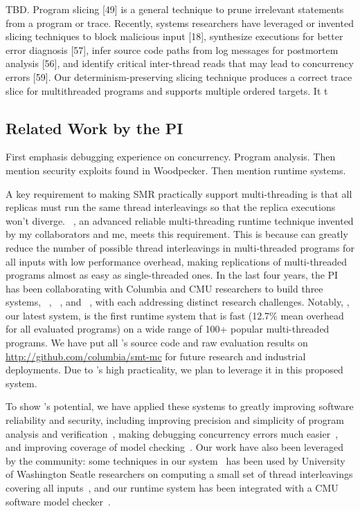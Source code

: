  TBD. Program slicing [49] is a general 
technique to prune irrelevant statements from a program or trace. Recently,
systems researchers have leveraged or invented slicing techniques
to block malicious input [18], synthesize executions for better error
diagnosis [57], infer source code paths from log messages for postmortem
analysis [56], and identify critical inter-thread reads that
may lead to concurrency errors [59]. Our determinism-preserving
slicing technique produces a correct trace slice for multithreaded
programs and supports multiple ordered targets. It t


\subsection{Related Work by the PI} \label{sec:my-work}

First emphasis debugging experience on concurrency. Program analysis.
Then mention security exploits found in Woodpecker.
Then mention runtime systems.

A key requirement to making SMR practically support multi-threading is that all 
replicas must run the same thread interleavings so that the replica executions 
won't diverge. \smt~\cite{smt:cacm}, an advanced reliable multi-threading 
runtime technique invented by my collaborators and me, meets this requirement. 
This is because \smt can greatly reduce the number of possible thread 
interleavings in multi-threaded programs for all inputs with low performance 
overhead, making replications of multi-threaded programs almost as easy as 
single-threaded ones. In the last four years, the PI has been collaborating 
with Columbia and CMU researchers to build three \smt systems, 
\tern~\cite{cui:tern:osdi10}, \peregrine~\cite{peregrine:sosp11}, and 
\parrot~\cite{parrot:sosp13}, with each addressing distinct research 
challenges. Notably, \parrot, our latest system, is the first \smt runtime 
system that is fast (12.7\% mean overhead for all evaluated programs) on a wide 
range of 100+ popular multi-threaded programs. We have 
put all \parrot's source code and raw evaluation results on 
\url{http://github.com/columbia/smt-mc} for future research and industrial 
deployments. Due to \parrot's high practicality, we plan to leverage it in this 
proposed \xxx system.

To show \smt's potential, we have applied these systems to greatly improving 
software reliability and security, including improving precision and simplicity 
of program analysis and verification~\cite{wu:pldi12}, making debugging 
concurrency errors much easier~\cite{cui:tern:osdi10}, and improving coverage 
of model checking~\cite{parrot:sosp13}. Our work have also been leveraged by 
the community: some techniques in our \tern system~\cite{cui:tern:osdi10} has 
been used by University of Washington Seatle researchers on computing a small 
set of thread interleavings covering all inputs~\cite{ics:oopsla13}, and our 
\parrot runtime system has been integrated with a CMU software model 
checker~\cite{dbug:spin11}.

